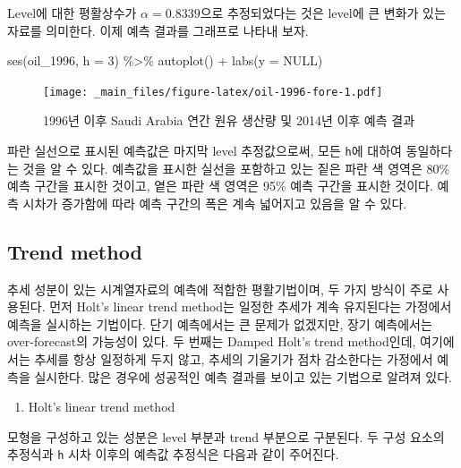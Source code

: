 \documentclass[
]{book}
\newenvironment{Shaded}{\begin{snugshade}}{\end{snugshade}}
\newcommand{\AttributeTok}[1]{\textcolor[rgb]{0.77,0.63,0.00}{#1}}
\newcommand{\ConstantTok}[1]{\textcolor[rgb]{0.00,0.00,0.00}{#1}}
\newcommand{\DecValTok}[1]{\textcolor[rgb]{0.00,0.00,0.81}{#1}}
\newcommand{\FunctionTok}[1]{\textcolor[rgb]{0.00,0.00,0.00}{#1}}
\newcommand{\NormalTok}[1]{#1}
\newcommand{\SpecialCharTok}[1]{\textcolor[rgb]{0.00,0.00,0.00}{#1}}
\providecommand{\tightlist}{%
  \setlength{\itemsep}{0pt}\setlength{\parskip}{0pt}}
\begin{document}
Level에 대한 평활상수가 \(\alpha = 0.8339\)으로 추정되었다는 것은 level에 큰 변화가 있는 자료를 의미한다. 이제 예측 결과를 그래프로 나타내 보자.

\begin{Shaded}
\begin{Highlighting}[]
\FunctionTok{ses}\NormalTok{(oil\_1996, }\AttributeTok{h =} \DecValTok{3}\NormalTok{) }\SpecialCharTok{\%\textgreater{}\%} 
  \FunctionTok{autoplot}\NormalTok{() }\SpecialCharTok{+} 
  \FunctionTok{labs}\NormalTok{(}\AttributeTok{y =} \ConstantTok{NULL}\NormalTok{)}
\end{Highlighting}
\end{Shaded}

\begin{figure}
\centering
\texttt{[image: \_main\_files/figure-latex/oil-1996-fore-1.pdf]}
\caption{\label{fig:oil-1996-fore}1996년 이후 Saudi Arabia 연간 원유 생산량 및 2014년 이후 예측 결과}
\end{figure}

파란 실선으로 표시된 예측값은 마지막 level 추정값으로써, 모든 \texttt{h}에 대하여 동일하다는 것을 알 수 있다. 예측값을 표시한 실선을 포함하고 있는 짙은 파란 색 영역은 80\% 예측 구간을 표시한 것이고, 옅은 파란 색 영역은 95\% 예측 구간을 표시한 것이다. 예측 시차가 증가함에 따라 예측 구간의 폭은 계속 넓어지고 있음을 알 수 있다.

\hypertarget{trend-method}{%
\subsection{Trend method}\label{trend-method}}

추세 성분이 있는 시계열자료의 예측에 적합한 평활기법이며, 두 가지 방식이 주로 사용된다. 먼저 Holt's linear trend method는 일정한 추세가 계속 유지된다는 가정에서 예측을 실시하는 기법이다. 단기 예측에서는 큰 문제가 없겠지만, 장기 예측에서는 over-forecast의 가능성이 있다. 두 번째는 Damped Holt's trend method인데, 여기에서는 추세를 항상 일정하게 두지 않고, 추세의 기울기가 점차 감소한다는 가정에서 예측을 실시한다. 많은 경우에 성공적인 예측 결과를 보이고 있는 기법으로 알려져 있다.

\begin{enumerate}
\def\labelenumi{\arabic{enumi}.}
\tightlist
\item
  Holt's linear trend method
\end{enumerate}

모형을 구성하고 있는 성분은 level 부분과 trend 부분으로 구분된다. 두 구성 요소의 추정식과 \texttt{h} 시차 이후의 예측값 추정식은 다음과 같이 주어진다.
\end{document}
